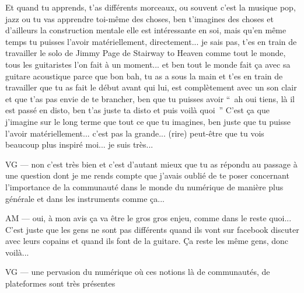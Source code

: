 Et quand tu apprends, t'as différents morceaux, ou souvent c'est la musique pop, jazz ou tu vas apprendre toi-même des choses, ben t'imagines des choses et d'ailleurs la construction mentale elle est intéressante en soi, mais qu'en même temps tu puisses l'avoir matériellement, directement... je sais pas, t'es en train de travailler le solo de Jimmy Page de Stairway to Heaven comme tout le monde, tous les guitaristes l'on fait à un moment... et ben tout le monde fait ça avec sa guitare acoustique parce que bon bah, tu as a sous la main et t'es en train de travailler que tu as fait le début avant qui lui, est complètement avec un son clair et que t'as pas envie de te brancher, ben que tu puisses avoir “ ah oui tiens, là il est passé en disto, ben t'as juste ta disto et puis voilà quoi ” C'est ça que j'imagine sur le long terme que tout ce que tu imagines, ben juste que tu puisse l'avoir matériellement... c'est pas la grande... (rire) peut-être que tu vois beaucoup plus inspiré moi... je suis très... 

VG — non c'est très bien et c'est d'autant mieux que tu as répondu au passage à une question dont je me rends compte que j'avais oublié de te poser concernant l'importance de la communauté dans le monde du numérique de manière plus générale et dans les instruments comme ça... 

AM — oui, à mon avis ça va être le gros gros enjeu, comme dans le reste quoi... C'est juste que les gens ne sont pas différents quand ils vont sur facebook discuter avec leurs copains et quand ils font de la guitare. Ça reste les même gens, donc voilà... 

VG — une pervasion du numérique où ces notions là de communautés, de plateformes sont très présentes

